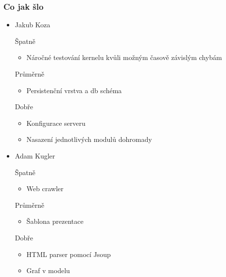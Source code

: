 \documentclass{beamer}
\begin{document}
\begin{frame}[allowframebreaks]\frametitle{Co jak šlo}
  \begin{itemize}
    \item Jakub Koza
     \begin{block}{Špatně} %
       \begin{itemize}
        \item Náročné testování kernelu kvůli možným časově závislým chybám
       \end{itemize}
     \end{block}
     \begin{block}{Průměrně} %
        \begin{itemize}
        \item Persistenční vrstva a db schéma
       \end{itemize}
     \end{block}
     \begin{block}{Dobře} %
       \begin{itemize}
        \item Konfigurace serveru
        \item Nasazení jednotlivých modulů dohromady
       \end{itemize}
     \end{block}
   
    \item Adam Kugler
      \begin{block}{Špatně} %
       \begin{itemize}
        \item Web crawler
       \end{itemize}
     \end{block}
     \begin{block}{Průměrně} %
        \begin{itemize}
        \item Šablona prezentace
       \end{itemize}
     \end{block}
     \begin{block}{Dobře} %
       \begin{itemize}
        \item HTML parser pomocí Jsoup
        \item Graf v modelu
       \end{itemize}
     \end{block}
  

\end{itemize}
\end{frame}
\end{document}
